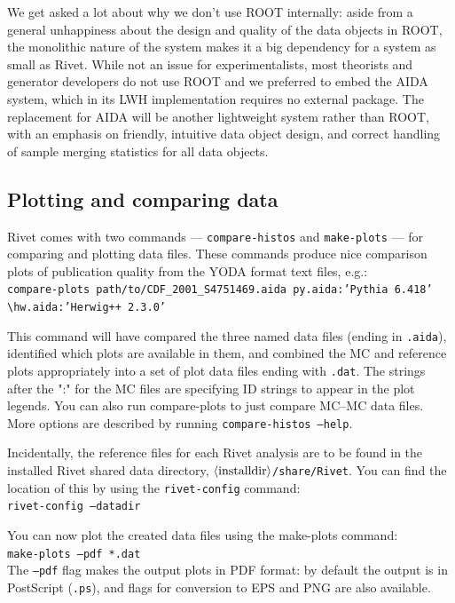 \documentclass{JHEP3}
\newcommand{\kbd}[1]{\texttt{#1}\xspace}
\newcommand{\inp}[1]{\textsf{\textdollar}\hspace{1mm}\texttt{#1}\xspace}
\newcommand{\val}[1]{\textit{\ensuremath{\langle\text{\textrm{#1}\/}\rangle}}\xspace}
\newcommand{\cmdbreak}{\textbackslash\newline}
\begin{document}
We get asked a lot about why we don't use ROOT internally: aside from a general
unhappiness about the design and quality of the data objects in ROOT, the
monolithic nature of the system makes it a big dependency for a system as small
as Rivet. While not an issue for experimentalists, most theorists and generator
developers do not use ROOT and we preferred to embed the AIDA system, which in
its LWH implementation requires no external package. The replacement for AIDA
will be another lightweight system rather than ROOT, with an emphasis on
friendly, intuitive data object design, and correct handling of sample merging
statistics for all data objects.


\subsection{Plotting and comparing data}

Rivet comes with two commands --- \kbd{compare-histos} and \kbd{make-plots} ---
for comparing and plotting data files. These commands produce nice comparison
plots of publication quality from the YODA format text files, e.g.:\\
\inp{compare-plots path/to/CDF_2001_S4751469.aida py.aida:'Pythia 6.418' \cmdbreak hw.aida:'Herwig++ 2.3.0'}

This command will have compared the three named data files (ending in
\kbd{.aida}), identified which plots are available in them, and combined the MC
and reference plots appropriately into a set of plot data files ending with
\kbd{.dat}. The strings after the ":" for the MC files are specifying ID strings to
appear in the plot legends. You can also run compare-plots to just compare MC--MC
data files. More options are described by running \kbd{compare-histos --help}.

Incidentally, the reference files for each Rivet analysis are to be found in the
installed Rivet shared data directory, \kbd{\val{installdir}/share/Rivet}. You
can find the location of this by using the \kbd{rivet-config} command:\\
\inp{rivet-config --datadir}

\noindent
You can now plot the created data files using the make-plots command:\\
\inp{make-plots --pdf *.dat}\\
The \kbd{--pdf} flag makes the output plots in PDF format: by default the output
is in PostScript (\kbd{.ps}), and flags for conversion to EPS and PNG are also
available.
\end{document}
